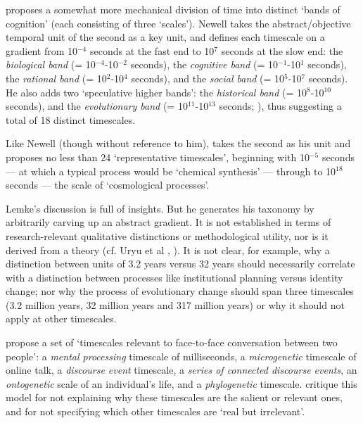 \citet[122]{newell_unified_1990} proposes a somewhat more mechanical division of time 
into distinct \textquoteleft bands of cognition' (each consisting of three \textquoteleft scales'). Newell takes the abstract/objective temporal unit of the second as a key 
unit, and defines each timescale on a gradient from 10$^{-4}$ 
seconds at the fast end to 10$^{7}$ seconds at the slow end: the 
\textit{biological band} (= 10$^{-4}$-10$^{-2}$ seconds), the 
\textit{cognitive band} (= 10$^{-1}$-10$^{1}$ seconds), the 
\textit{rational band} (= 10$^{2}$-10$^{4}$ seconds), and the 
\textit{social band} (= 10$^{5}$-10$^{7}$ seconds). He also 
adds two \textquoteleft speculative higher bands': the \textit{historical band} (= 
10$^{8}$-10$^{10}$ seconds), and the \textit{evolutionary band} 
(= 10$^{11}$-10$^{13}$ seconds; \citealt[152]{newell_unified_1990}), thus suggesting a 
total of 18 distinct timescales. 



Like Newell (though without reference to him), \citet[277]{lemke_across_2000} takes 
the second as his unit and proposes no less than 24 \textquoteleft representative 
timescales', beginning with 10$^{-5}$ seconds --- at which a typical 
process would be \textquoteleft chemical synthesis' --- through to 10$^{18}$ 
seconds --- the scale of \textquoteleft cosmological processes'. 



Lemke's discussion is full of insights. But he generates his taxonomy by arbitrarily carving up an abstract gradient. It is not established in terms of research-relevant qualitative distinctions or 
methodological utility, nor is it derived from a theory (cf.  
Uryu et al \citeyear{uryu_ecology_2014}, \citeyear[169]{larsen-freeman_complexity_2008}). It is not clear, for example, why a distinction between units of 3.2 years 
versus 32 years should necessarily correlate with a distinction between 
processes like institutional planning versus identity change; nor why 
the process of evolutionary change should span three timescales (3.2 
million years, 32 million years and 317 million years) or why it should 
not apply at other timescales. 



\citet[169]{larsen-freeman_complexity_2008} propose a set of \textquoteleft timescales 
relevant to face-to-face conversation between two people': a \textit{mental processing }timescale of milliseconds, a \textit{microgenetic }
timescale of online talk, a \textit{discourse event} timescale, a 
\textit{series of connected discourse events}, an \textit{ontogenetic }scale of an individual's life, and a \textit{phylogenetic} timescale. \citet{uryu_ecology_2014} critique this model for not explaining why these 
timescales are the salient or relevant ones, and for not specifying 
which other timescales are \textquoteleft real but irrelevant'. 



